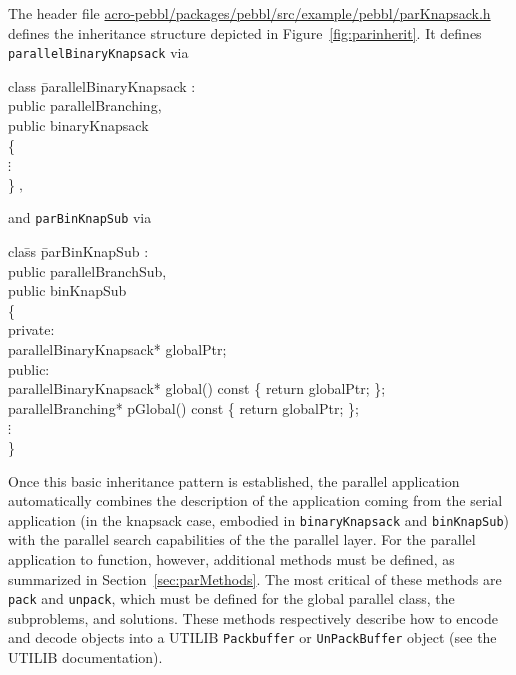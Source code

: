 The header file
\url{acro-pebbl/packages/pebbl/src/example/pebbl/parKnapsack.h}
defines the inheritance structure depicted in
Figure~\ref{fig:parinherit}.  It defines
\texttt{parallelBinaryKnapsack} via
\begin{codeblock}
class \=parallelBinaryKnapsack : \\
\>public parallelBranching, \\
\>public binaryKnapsack \\
\{ \\
\>$\vdots$\\
\}$\;,$\\
\end{codeblock}
and \texttt{parBinKnapSub} via
\begin{codeblock}
cla\=ss \=parBinKnapSub : \\
\>\>public parallelBranchSub, \\
\>\>public binKnapSub \\
\{ \\
private: \\
\>parallelBinaryKnapsack* globalPtr; \\
public: \\
\>parallelBinaryKnapsack* global()  const \{ return globalPtr; \}; \\
\>parallelBranching*      pGlobal() const \{ return globalPtr; \}; \\
\>\>$\vdots$\\
\}
\end{codeblock}

Once this basic inheritance pattern is established, the parallel
application automatically combines the description of the application
coming from the serial application (in the knapsack case, embodied in
\texttt{binaryKnapsack} and \texttt{binKnapSub}) with the parallel
search capabilities of the the parallel layer.  For the parallel
application to function, however, additional methods must be defined,
as summarized in Section~\ref{sec:parMethods}.  The most critical of
these methods are \texttt{pack} and \texttt{unpack}, which must be
defined for the global parallel class, the subproblems, and solutions.
These methods respectively describe how to encode and decode objects
into a UTILIB \texttt{Packbuffer} or \texttt{UnPackBuffer}
object (see the UTILIB documentation).

